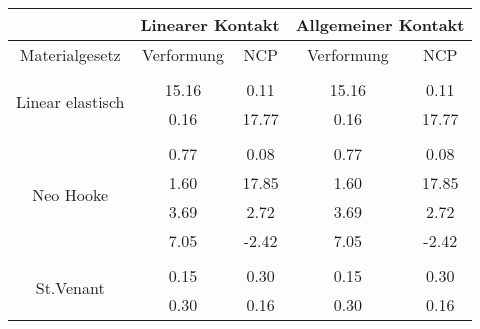 \begin{table} 
\centering 
\begin{tabular}{c|cc|cc|} 
\cline{2-5} 
 & \multicolumn{2}{|c|}{Linearer Kontakt} & \multicolumn{2}{|c|}{Allgemeiner Kontakt} \\ 
\hline 
\multicolumn{1}{|c|}{Materialgesetz} & \multicolumn{1}{c|}{Verformung} & \multicolumn{1}{c|}{NCP} & \multicolumn{1}{c|}{Verformung} & \multicolumn{1}{c|}{NCP} \\ 
\hline 
\multicolumn{1}{|c|}{\multirow{3}{*}{Linear elastisch}} &\multicolumn{1}{|c|}{} & \multicolumn{1}{|c|}{} & \multicolumn{1}{|c|}{} & \multicolumn{1}{|c|}{} \\ 
\multicolumn{1}{|c|}{} & \multicolumn{1}{|c|}{     15.16} & \multicolumn{1}{|c|}{      0.11} & \multicolumn{1}{|c|}{     15.16} & \multicolumn{1}{|c|}{      0.11} \\ 
\multicolumn{1}{|c|}{} & \multicolumn{1}{|c|}{      0.16} & \multicolumn{1}{|c|}{     17.77} & \multicolumn{1}{|c|}{      0.16} & \multicolumn{1}{|c|}{     17.77} \\ 
\hline 
\multicolumn{1}{|c|}{\multirow{5}{*}{Neo Hooke}} &\multicolumn{1}{|c|}{} & \multicolumn{1}{|c|}{} & \multicolumn{1}{|c|}{} & \multicolumn{1}{|c|}{} \\ 
\multicolumn{1}{|c|}{} & \multicolumn{1}{|c|}{      0.77} & \multicolumn{1}{|c|}{      0.08} & \multicolumn{1}{|c|}{      0.77} & \multicolumn{1}{|c|}{      0.08} \\ 
\multicolumn{1}{|c|}{} & \multicolumn{1}{|c|}{      1.60} & \multicolumn{1}{|c|}{     17.85} & \multicolumn{1}{|c|}{      1.60} & \multicolumn{1}{|c|}{     17.85} \\ 
\multicolumn{1}{|c|}{} & \multicolumn{1}{|c|}{      3.69} & \multicolumn{1}{|c|}{      2.72} & \multicolumn{1}{|c|}{      3.69} & \multicolumn{1}{|c|}{      2.72} \\ 
\multicolumn{1}{|c|}{} & \multicolumn{1}{|c|}{      7.05} & \multicolumn{1}{|c|}{     -2.42} & \multicolumn{1}{|c|}{      7.05} & \multicolumn{1}{|c|}{     -2.42} \\ 
\hline 
\multicolumn{1}{|c|}{\multirow{7}{*}{St.Venant}} &\multicolumn{1}{|c|}{} & \multicolumn{1}{|c|}{} & \multicolumn{1}{|c|}{} & \multicolumn{1}{|c|}{} \\ 
\multicolumn{1}{|c|}{} & \multicolumn{1}{|c|}{      0.15} & \multicolumn{1}{|c|}{      0.30} & \multicolumn{1}{|c|}{      0.15} & \multicolumn{1}{|c|}{      0.30} \\ 
\multicolumn{1}{|c|}{} & \multicolumn{1}{|c|}{      0.30} & \multicolumn{1}{|c|}{      0.16} & \multicolumn{1}{|c|}{      0.30} & \multicolumn{1}{|c|}{      0.16} \\ 

\end{tabular}
\end{table}
